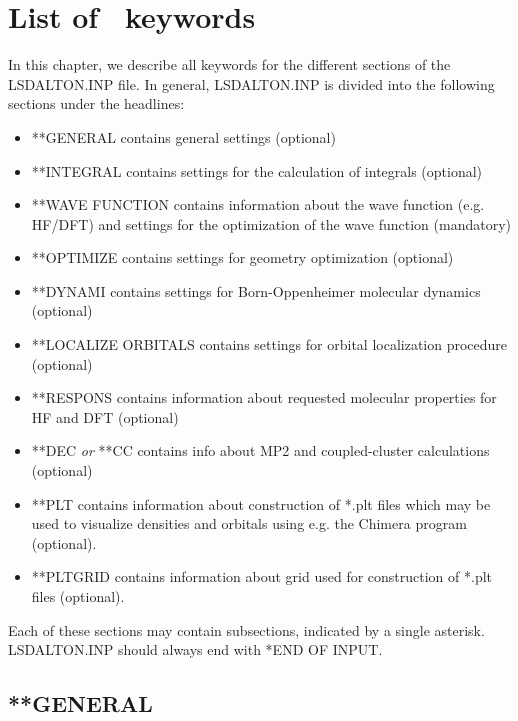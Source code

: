
\chapter{List of \lsdalton\ keywords}\label{ch:keywords}

In this chapter, we describe all keywords for the different sections
of the LSDALTON.INP file. In general, LSDALTON.INP is divided into the following sections under
the headlines:
\begin{itemize}
\item **GENERAL contains general settings (optional)
\item **INTEGRAL contains settings for the calculation of integrals (optional)
\item **WAVE FUNCTION contains information about the wave function (e.g. HF/DFT) and settings
for the optimization of the wave function (mandatory)
\item **OPTIMIZE contains settings for geometry optimization (optional)
\item **DYNAMI contains settings for Born-Oppenheimer molecular dynamics (optional)
\item **LOCALIZE ORBITALS contains settings for orbital localization procedure (optional)
\item **RESPONS contains information about requested molecular properties for HF and DFT (optional)
\item **DEC \emph{or} **CC contains info about MP2 and coupled-cluster calculations (optional)
\item **PLT contains information about construction of *.plt files which may be used to visualize densities and orbitals using e.g. the Chimera program~\cite{chimera} (optional).
\item **PLTGRID contains information about grid used for construction of *.plt files (optional).
\end{itemize}
Each of these sections may contain subsections, indicated by a single asterisk. LSDALTON.INP
should always end with *END OF INPUT. 

\section{**GENERAL}\label{sec:general}

